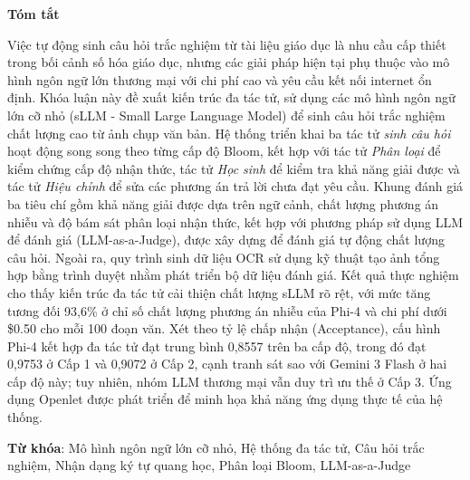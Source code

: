 \begin{center}
\textbf{\large{Tóm tắt}}
\end{center}


\begin{small}

Việc tự động sinh câu hỏi trắc nghiệm từ tài liệu giáo dục là nhu cầu cấp thiết trong bối cảnh số hóa giáo dục, nhưng các giải pháp hiện tại phụ thuộc vào mô hình ngôn ngữ lớn thương mại với chi phí cao và yêu cầu kết nối internet ổn định. Khóa luận này đề xuất kiến trúc đa tác tử, sử dụng các mô hình ngôn ngữ lớn cỡ nhỏ (sLLM - Small Large Language Model) để sinh câu hỏi trắc nghiệm chất lượng cao từ ảnh chụp văn bản. Hệ thống triển khai ba tác tử \textit{sinh câu hỏi} hoạt động song song theo từng cấp độ Bloom, kết hợp với tác tử \textit{Phân loại} để kiểm chứng cấp độ nhận thức, tác tử \textit{Học sinh} để kiểm tra khả năng giải được và tác tử \textit{Hiệu chỉnh} để sửa các phương án trả lời chưa đạt yêu cầu. Khung đánh giá ba tiêu chí gồm khả năng giải được dựa trên ngữ cảnh, chất lượng phương án nhiễu và độ bám sát phân loại nhận thức, kết hợp với phương pháp sử dụng LLM để đánh giá (LLM-as-a-Judge), được xây dựng để đánh giá tự động chất lượng câu hỏi. Ngoài ra, quy trình sinh dữ liệu OCR sử dụng kỹ thuật tạo ảnh tổng hợp bằng trình duyệt nhằm phát triển bộ dữ liệu đánh giá. Kết quả thực nghiệm cho thấy kiến trúc đa tác tử cải thiện chất lượng sLLM rõ rệt, với mức tăng tương đối 93,6\% ở chỉ số chất lượng phương án nhiễu của Phi-4 và chi phí dưới \$0.50 cho mỗi 100 đoạn văn. Xét theo tỷ lệ chấp nhận (Acceptance), cấu hình Phi-4 kết hợp đa tác tử đạt trung bình 0,8557 trên ba cấp độ, trong đó đạt 0,9753 ở Cấp 1 và 0,9072 ở Cấp 2, cạnh tranh sát sao với Gemini 3 Flash ở hai cấp độ này; tuy nhiên, nhóm LLM thương mại vẫn duy trì ưu thế ở Cấp 3. Ứng dụng Openlet được phát triển để minh họa khả năng ứng dụng thực tế của hệ thống.

\vspace*{1cm}
\textbf{Từ khóa}: Mô hình ngôn ngữ lớn cỡ nhỏ, Hệ thống đa tác tử, Câu hỏi trắc nghiệm, Nhận dạng ký tự quang học, Phân loại Bloom, LLM-as-a-Judge

\end{small}
